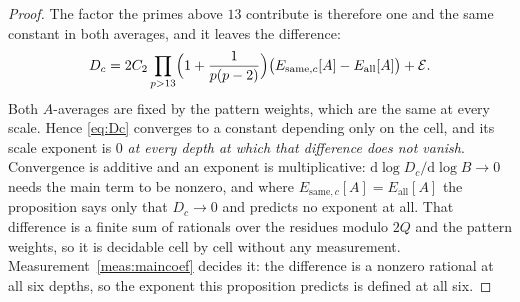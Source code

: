 \documentclass[11pt,a4paper]{article}
\theoremstyle{plain}
\theoremstyle{definition}
\theoremstyle{remark}
\begin{document}
\begin{proof}
The factor the primes above $13$ contribute is therefore one and the
same constant in both averages, and it leaves the difference:
\[
  D_c=2C_2\prod_{p>13}\Bigl(1+\frac1{p(p-2)}\Bigr)
  \bigl(E_{\mathrm{same},c}[A]-E_{\mathrm{all}}[A]\bigr)
  +\mathcal E.
\]
Both $A$-averages are fixed by the pattern weights, which are the same
at every scale. Hence \eqref{eq:Dc} converges to a constant depending
only on the cell, and its scale exponent is $0$ \emph{at every depth
at which that difference does not vanish}. Convergence is additive and
an exponent is multiplicative: $\mathrm{d}\log D_c/\mathrm{d}\log B\to0$
needs the main term to be nonzero, and where
$E_{\mathrm{same},c}[A]=E_{\mathrm{all}}[A]$ the proposition says only
that $D_c\to0$ and predicts no exponent at all. That difference is a
finite sum of rationals over the residues modulo $2Q$ and the pattern
weights, so it is decidable cell by cell without any measurement.
Measurement~\ref{meas:maincoef} decides it: the difference is a
nonzero rational at all six depths, so the exponent this proposition
predicts is defined at all six.
\end{proof}
\end{document}
